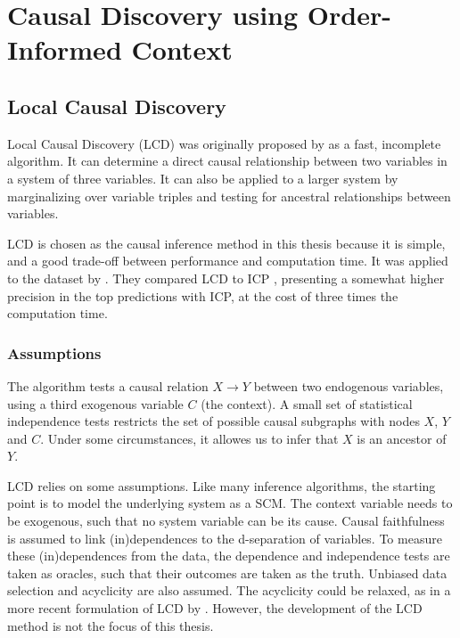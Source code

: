 \newpage
\section{Causal Discovery using Order-Informed Context}


\subsection{Local Causal Discovery}

Local Causal Discovery (LCD) was originally proposed by \citet{cooper1997simple} as a fast, incomplete algorithm. It can determine a direct causal relationship between two variables in a system of three variables. It can also be applied to a larger system by marginalizing over variable triples and testing for ancestral relationships between variables. 

LCD is chosen as the causal inference method in this thesis because it is simple, and a good trade-off between performance and computation time. It was applied to the \citet{kemmeren2014large} dataset by \citet{versteeg2019boosting}. They compared LCD to ICP \citep{peters2016causal}, presenting a somewhat higher precision in the top predictions with ICP, at the cost of three times the computation time. 

\subsubsection{Assumptions}

The algorithm tests a causal relation $X\to Y$ between two endogenous variables, using a third exogenous variable $C$ (the context). A small set of statistical independence tests restricts the set of possible causal subgraphs with nodes $X$, $Y$ and $C$. Under some circumstances, it allowes us to infer  that $X$ is an ancestor of $Y$.

LCD relies on some assumptions. Like many inference algorithms, the starting point is to model the underlying system as a SCM. The context variable needs to be exogenous, such that no system variable can be its cause. Causal faithfulness is assumed to link (in)dependences to the d-separation of variables. To measure these (in)dependences from the data, the dependence and independence tests are taken as oracles, such that their outcomes are taken as the truth. Unbiased data selection and acyclicity are also assumed. The acyclicity could be relaxed, as in a more recent formulation of LCD by \citet{mooij2016joint}. However, the development of the LCD method is not the focus of this thesis.

